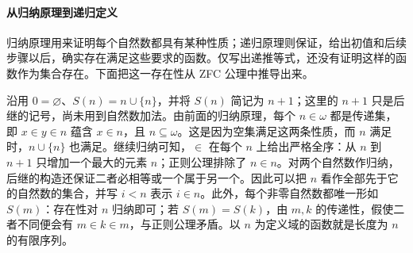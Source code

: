 \documentclass[lang=cn,a4paper,fontset=none,zihao=false,10pt,openany,twoside]{beautybook}
\numberwithin{algorithm}{chapter}
\begin{document}
\paragraph{从归纳原理到递归定义}
归纳原理用来证明每个自然数都具有某种性质；递归原理则保证，给出初值和后续步骤以后，确实存在满足这些要求的函数。仅写出递推等式，还没有证明这样的函数作为集合存在。下面把这一存在性从 ZFC 公理中推导出来。

沿用 $0=\varnothing$、$S(n)=n\cup\{n\}$，并将 $S(n)$ 简记为 $n+1$；这里的 $n+1$ 只是后继的记号，尚未用到自然数加法。由前面的归纳原理，每个 $n\in\omega$ 都是传递集，即 $x\in y\in n$ 蕴含 $x\in n$，且 $n\subseteq\omega$。这是因为空集满足这两条性质，而 $n$ 满足时，$n\cup\{n\}$ 也满足。继续归纳可知，$\in$ 在每个 $n$ 上给出严格全序：从 $n$ 到 $n+1$ 只增加一个最大的元素 $n$；正则公理排除了 $n\in n$。对两个自然数作归纳，后继的构造还保证二者必相等或一个属于另一个。因此可以把 $n$ 看作全部先于它的自然数的集合，并写 $i<n$ 表示 $i\in n$。此外，每个非零自然数都唯一形如 $S(m)$：存在性对 $n$ 归纳即可；若 $S(m)=S(k)$，由 $m,k$ 的传递性，假使二者不同便会有 $m\in k\in m$，与正则公理矛盾。以 $n$ 为定义域的函数就是长度为 $n$ 的有限序列。
\end{document}
